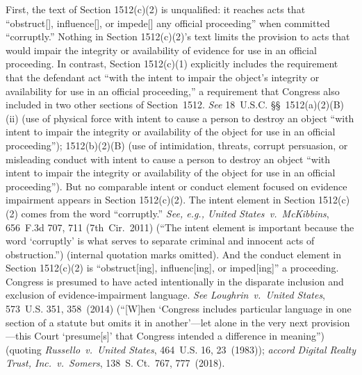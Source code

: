 First, the text of Section 1512(c)(2) is unqualified: it reaches acts that ``obstruct[], influence[], or impede[] any official proceeding'' when committed ``corruptly.''
Nothing in Section 1512(c)(2)'s text limits the provision to acts that would impair the integrity or availability of evidence for use in an official proceeding.
In contrast, Section 1512(c)(1) explicitly includes the requirement that the defendant act ``with the intent to impair the object's integrity or availability for use in an official proceeding,'' a requirement that Congress also included in two other sections of Section~1512.
\textit{See} 18~U.S.C. \S\S~1512(a)(2)(B)(ii) (use of physical force with intent to cause a person to destroy an object ``with intent to impair the integrity or availability of the object for use in an official proceeding'');
1512(b)(2)(B) (use of intimidation, threats, corrupt persuasion, or misleading conduct with intent to cause a person to destroy an object ``with intent to impair the integrity or availability of the object for use in an official proceeding'').
But no comparable intent or conduct element focused on evidence impairment appears in Section 1512(c)(2).
The intent element in Section 1512(c)(2) comes from the word ``corruptly.''
\textit{See, e.g., United States~v.\ McKibbins}, 656~F.3d 707, 711 (7th~Cir.~2011) (``The intent element is important because the word `corruptly' is what serves to separate criminal and innocent acts of obstruction.'') (internal quotation marks omitted).
And the conduct element in Section 1512(c)(2) is ``obstruct[ing], influenc[ing], or imped[ing]'' a proceeding.
Congress is presumed to have acted intentionally in the disparate inclusion and exclusion of evidence-impairment language.
\textit{See Loughrin~v.\ United States}, 573~U.S. 351, 358~(2014) (``[W]hen `Congress includes particular language in one section of a statute but omits it in another'---let alone in the very next provision---this Court `presume[s]' that Congress intended a difference in meaning'') (quoting \textit{Russello~v.\ United States}, 464~U.S. 16, 23~(1983));
\textit{accord Digital Realty Trust, Inc.~v.\ Somers}, 138~S. Ct.~767, 777~(2018).

